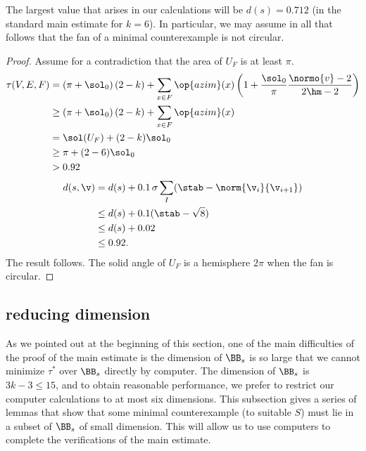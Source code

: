 The largest value that arises in our calculations will be
$d(s)=0.712$ (in the standard main estimate for $k=6$).  In particular,
we may assume in all that follows that the fan of a minimal counterexample
is not circular.

\begin{proof}
Assume for a contradiction that the area of $U_F$ is at least $\pi$.
\begin{align*}
\tau(V,E,F) &=\left(\pi+{\sol_0}\right) (2- k)+ \sum_{x\in F}\op{azim}(x)
\left(1 + \dfrac{\sol_0}{\pi}  \dfrac{\normo{v}-2}{2\hm-2}\right) \\
  &\ge\left(\pi+{\sol_0}\right) (2- k)+ \sum_{x\in F} \op{azim}(x) \\
  &=\sol(U_F) + (2-k)\sol_0\\
  &\ge \pi + (2-6)\sol_0 \\
  &> 0.92
\end{align*}
\begin{align*}
d(s,\v) &= d(s) + 0.1\, \sigma \sum_I (\stab  - \norm{\v_i}{\v_{i+1}}) \\
   &\le d(s) + 0.1 (\stab - \sqrt{8}) \\
   &\le d(s) + 0.02\\
    &\le 0.92.
\end{align*}
The result follows.  The solid angle of $U_F$ is 
a hemisphere $2\pi$ when the fan is circular.
\end{proof}

\subsection{reducing dimension}

As we pointed out at the beginning of this section, one of the main
difficulties of the proof of the main estimate is the dimension of
$\BB_s$ is so large that we cannot minimize $\tau^*$ over $\BB_s$ directly
by computer.  The dimension of $\BB_s$ is $ 3 k- 3 \le 15$, and to
obtain reasonable performance, we prefer to restrict our computer
calculations to at most six dimensions.  This subsection gives a
series of lemmas that show that some minimal counterexample (to
suitable $S$) must lie in a subset of $\BB_s$ of small dimension.
This will allow us to use computers to complete the verifications of
the main estimate.

